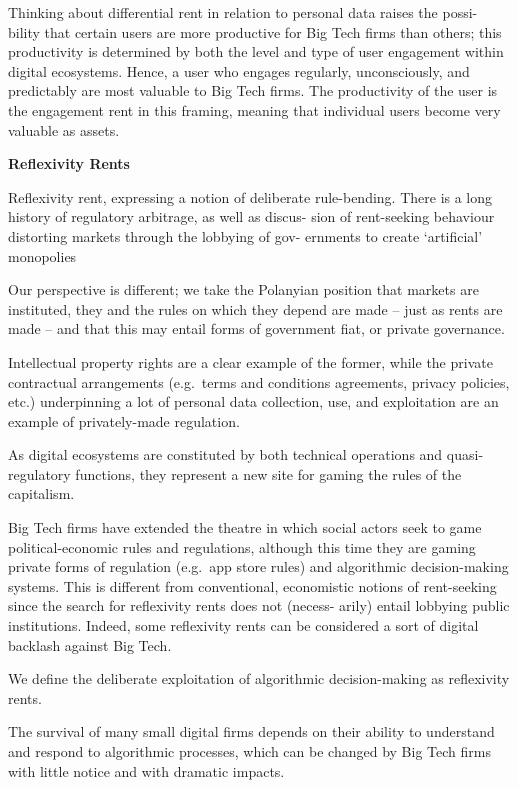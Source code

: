\documentclass[
]{book}
\begin{document}
Thinking about differential rent in relation to personal data raises the possi-
bility that certain users are more productive for Big Tech firms than others; this
productivity is determined by both the level and type of user engagement within
digital ecosystems. Hence, a user who engages regularly, unconsciously, and
predictably are most valuable to Big Tech firms. The productivity of the user
is the engagement rent in this framing, meaning that individual users become
very valuable as assets.

\textbf{Reflexivity Rents}

Reflexivity rent, expressing a notion of deliberate
rule-bending. There is a long history of regulatory arbitrage, as well as discus-
sion of rent-seeking behaviour distorting markets through the lobbying of gov-
ernments to create `artificial' monopolies

Our perspective is different; we take
the Polanyian position that markets are instituted, they and the rules on
which they depend are made -- just as rents are made -- and that this may
entail forms of government fiat, or private governance.

Intellectual property rights are a clear example of the former,
while the private contractual arrangements (e.g.~terms and
conditions agreements, privacy policies, etc.) underpinning a lot of personal
data collection, use, and exploitation are an example of privately-made regulation.

As digital ecosystems are constituted by both technical operations and quasi-
regulatory functions, they represent a new site for gaming the rules of the
capitalism.

Big Tech firms have extended the theatre in which social actors seek
to game political-economic rules and regulations, although this time they are
gaming private forms of regulation (e.g.~app store rules) and algorithmic
decision-making systems. This is different from conventional, economistic
notions of rent-seeking since the search for reflexivity rents does not (necess-
arily) entail lobbying public institutions. Indeed, some reflexivity rents can be
considered a sort of digital backlash against Big Tech.

We define the deliberate exploitation of algorithmic
decision-making as reflexivity rents.

The survival of many small digital firms depends on
their ability to understand and respond to algorithmic processes, which can be
changed by Big Tech firms with little notice and with dramatic impacts.
\end{document}

